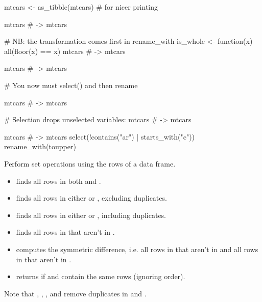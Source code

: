 \documentclass[a4paper]{book}
\begin{document}
\begin{Examples}
\begin{ExampleCode}
mtcars <- as_tibble(mtcars) # for nicer printing

mtcars %
# ->
mtcars %

# NB: the transformation comes first in rename_with
is_whole <- function(x) all(floor(x) == x)
mtcars %
# ->
mtcars %

mtcars %
# ->
mtcars %

# You now must select() and then rename

mtcars %
# ->
mtcars %

# Selection drops unselected variables:
mtcars %
# ->
mtcars %

mtcars %
# ->
mtcars %
  select(!contains("ar") | starts_with("c")) %
  rename_with(toupper)
\end{ExampleCode}
\end{Examples}
%
\begin{Description}
Perform set operations using the rows of a data frame.
\begin{itemize}

\item{}  finds all rows in both  and .
\item{}  finds all rows in either  or , excluding duplicates.
\item{}  finds all rows in either  or , including duplicates.
\item{}  finds all rows in  that aren't in .
\item{}  computes the symmetric difference, i.e. all rows in
 that aren't in  and all rows in  that aren't in .
\item{}  returns  if  and  contain the same rows
(ignoring order).

\end{itemize}


Note that , , , and  remove
duplicates in  and .
\end{Description}
\end{document}
